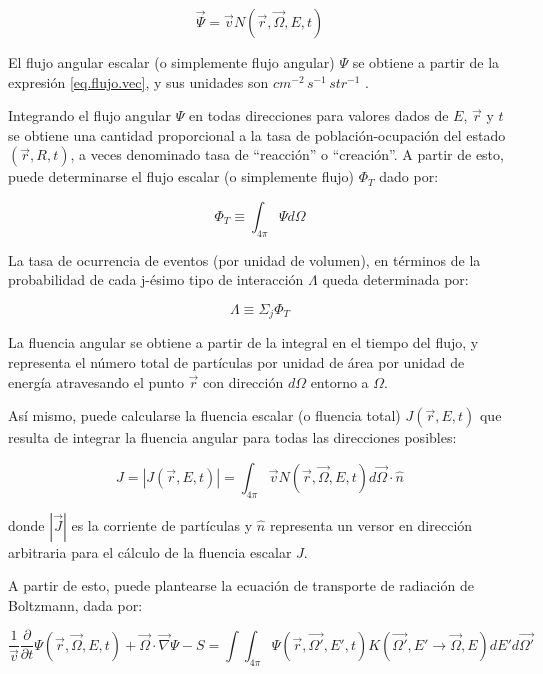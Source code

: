 \begin{equation}
 \vec{\Psi} = \vec{v}N(\vec{r}, \vec{\Omega}, E, t)
 \label{eq.flujo.vec}
\end{equation}

El flujo angular escalar (o simplemente flujo angular) $\Psi$ se obtiene a partir de la expresión \ref{eq.flujo.vec}, y sus unidades son $cm^{-2}\, s^{-1} \, str^{-1}$ .

Integrando el flujo angular $\Psi$ en todas direcciones para valores dados de $E$, $\vec{r}$ y $t$ se obtiene una cantidad proporcional a la tasa de población-ocupación del estado $(\vec{r}, R,t)$, a veces denominado tasa de “reacción” o “creación”. A partir de esto, puede determinarse el flujo escalar (o simplemente flujo) $\Phi_T$ dado por:

\begin{equation}
 \Phi_T \equiv \int_{4\pi} \Psi d\Omega
\end{equation}

La tasa de ocurrencia de eventos (por unidad de volumen), en términos de la probabilidad de cada j-ésimo tipo de interacción $\Lambda$ queda determinada por:

\begin{equation}
 \Lambda \equiv \Sigma_j \Phi_T
\end{equation}

La fluencia angular se obtiene a partir de la integral en el tiempo del flujo, y representa el número total de partículas por unidad de área por unidad de energía atravesando el punto $\vec{r}$ con dirección $d\Omega$ entorno a $\Omega$.

Así mismo, puede calcularse la fluencia escalar (o fluencia total) $J(\vec{r}, E,t)$ que resulta de integrar la fluencia angular para todas las direcciones posibles:

\begin{equation}
 J = |J(\vec{r}, E,t)| = \int_{4\pi} \vec{v} N(\vec{r}, \vec{\Omega}, E, t) d\vec{\Omega}\cdot\hat{n}
\end{equation}

\noindent
donde $|\vec{J}|$ es la corriente de partículas y $\hat{n}$ representa un versor en dirección arbitraria para el cálculo de la fluencia escalar $J$.

A partir de esto, puede plantearse la ecuación de transporte de radiación de Boltzmann, dada por:

\begin{equation}
 \frac{1}{\vec{v}}\frac{\partial}{\partial t}\Psi(\vec{r}, \vec{\Omega}, E, t) + \vec{\Omega}\cdot \vec{\nabla}\Psi - S = \int \int_{4\pi} \Psi(\vec{r}, \vec{\Omega'}, E', t) K(\vec{\Omega'}, E' \rightarrow \vec{\Omega}, E) dE' d\vec{\Omega'}
 \label{ETB}
\end{equation}

